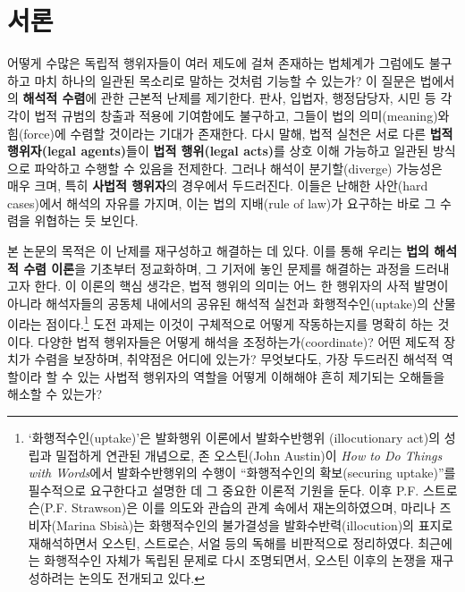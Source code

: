 \documentclass[12pt,a4paper]{article}
\begin{document}
\section{서론}

어떻게 수많은 독립적 행위자들이 여러 제도에 걸쳐 존재하는 법체계가
그럼에도 불구하고 마치 하나의 일관된 목소리로 말하는 것처럼 기능할 수
있는가? 이 질문은 법에서의 \textbf{해석적 수렴}에 관한 근본적 난제를
제기한다. 판사, 입법자, 행정담당자, 시민 등 각각이 법적 규범의 창출과
적용에 기여함에도 불구하고, 그들이 법의 \textsf{의미(meaning)}와
\textsf{힘(force)}에 수렴할 것이라는 기대가 존재한다. 다시 말해, 법적
실천은 서로 다른 \textbf{법적 행위자(legal agents)}들이 \textbf{법적
행위(legal acts)}를 상호 이해 가능하고 일관된 방식으로 파악하고 수행할
수 있음을 전제한다. 그러나 해석이 분기할(diverge) 가능성은 매우 크며,
특히 \textbf{사법적 행위자}의 경우에서 두드러진다. 이들은 난해한
사안(hard cases)에서 해석의 자유를 가지며, 이는 법의 지배(rule of law)가
요구하는 바로 그 수렴을 위협하는 듯 보인다.

본 논문의 목적은 이 난제를 재구성하고 해결하는 데 있다. 이를 통해 우리는
\textbf{법의 해석적 수렴 이론}을 기초부터 정교화하며, 그 기저에 놓인
문제를 해결하는 과정을 드러내고자 한다. 이 이론의 핵심 생각은, 법적
행위의 의미는 어느 한 행위자의 사적 발명이 아니라 해석자들의 공동체
내에서의 공유된 해석적 실천과 화행적수인(uptake)의 산물이라는
점이다.\footnote{`화행적수인(uptake)'은 발화행위 이론에서 발화수반행위
  (illocutionary act)의 성립과 밀접하게 연관된 개념으로, 존 오스틴(John
  Austin)이 \emph{How to Do Things with Words}에서 발화수반행위의 수행이
  ``화행적수인의 확보(securing uptake)''를 필수적으로 요구한다고 설명한
  데 그 중요한 이론적 기원을 둔다\autocite{Austin1962}. 이후 P.F.
  스트로슨(P.F. Strawson)은 이를 의도와 관습의 관계 속에서
  재논의하였으며\autocite{Strawson1964}, 마리나 즈비자(Marina Sbisà)는
  화행적수인의 불가결성을 발화수반력(illocution)의 표지로 재해석하면서
  오스틴, 스트로슨, 서얼 등의 독해를 비판적으로
  정리하였다\autocite{Sbisa2009}. 최근에는 화행적수인 자체가 독립된 문제로
  다시 조명되면서, 오스틴 이후의 논쟁을 재구성하려는 논의도 전개되고
  있다\autocite{deLara2024}.} 도전 과제는 이것이 구체적으로 어떻게
작동하는지를 명확히 하는 것이다. 다양한 법적 행위자들은 어떻게 해석을
조정하는가(coordinate)? 어떤 제도적 장치가 수렴을 보장하며, 취약점은
어디에 있는가? 무엇보다도, 가장 두드러진 해석적 역할이라 할 수 있는
사법적 행위자의 역할을 어떻게 이해해야 흔히 제기되는 오해들을 해소할 수
있는가?
\end{document}
